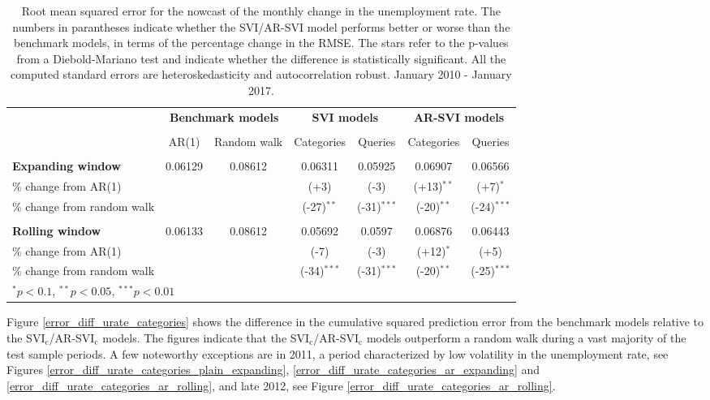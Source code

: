 \begin{table}[H]
	\center
	\scriptsize
		\begin{tabular}{@{\extracolsep{4pt}}lcccccc@{}}
  			\toprule
 			& \multicolumn{2}{c}{\textbf{Benchmark models}} & \multicolumn{2}{c}{\textbf{SVI models}} & \multicolumn{2}{c}{\textbf{AR-SVI models}} \\
 			\cline{2-3} \cline{4-5}  \cline{6-7} \\ [-1.5ex]
			& AR(1) & Random walk & Categories & Queries & Categories & Queries \\ \\
			\textbf{Expanding window} & 0.06129 & 0.08612 & 0.06311 & 0.05925 & 0.06907 & 0.06566 \\
			\% change from AR(1) & & & (+3) & (-3) & (+13)$^{**}$ & (+7)$^{*}$ \\
			\% change from random walk & & & (-27)$^{**}$  & (-31)$^{***}$ & (-20)$^{**}$ & (-24)$^{***}$ \\ \\
			
			\textbf{Rolling window} & 0.06133 & 0.08612 & 0.05692 & 0.0597 & 0.06876 &  0.06443\\
			\% change from AR(1) & & & (-7) & (-3) & (+12)$^{*}$ & (+5) \\
			\% change from random walk & & & (-34)$^{***}$ & (-31)$^{***}$ & (-20)$^{**}$ & (-25)$^{***}$ \\			
			\bottomrule
			\multicolumn{7}{l}{$^{*}p < 0.1$, $^{**}p < 0.05$, $^{***}p < 0.01$} \\
		\end{tabular}
\caption{Root mean squared error for the nowcast of the monthly change in the unemployment rate. The numbers in parantheses indicate whether the SVI/AR-SVI model performs better or worse than the benchmark models, in terms of the percentage change in the RMSE. The stars refer to the p-values from a Diebold-Mariano test and indicate whether the difference is statistically significant. All the computed standard errors are heteroskedasticity and autocorrelation robust. January 2010 - January 2017.}
\label{rmse_urate}
\end{table}
\newpage Figure \ref{error_diff_urate_categories} shows the difference in the cumulative squared prediction error from the benchmark models relative to the SVI$_\text{c}$/AR-SVI$_\text{c}$ models. The figures indicate that the SVI$_\text{c}$/AR-SVI$_\text{c}$ models outperform a random walk during a vast majority of the test sample periods. A few noteworthy exceptions are in 2011, a period characterized by low volatility in the unemployment rate, see Figures \ref{error_diff_urate_categories_plain_expanding}, \ref{error_diff_urate_categories_ar_expanding} and \ref{error_diff_urate_categories_ar_rolling}, and late 2012, see Figure \ref{error_diff_urate_categories_ar_rolling}.

